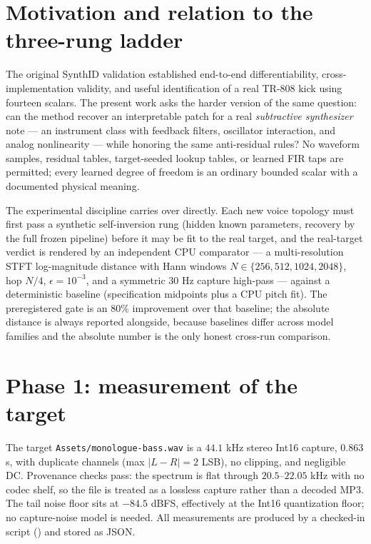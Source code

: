 \documentclass[10pt]{article}
\newcommand{\code}[1]{\texttt{#1}}
\begin{document}
\section{Motivation and relation to the three-rung ladder}

The original SynthID validation established end-to-end differentiability, cross-implementation validity, and useful identification of a real TR-808 kick using fourteen scalars. The present work asks the harder version of the same question: can the method recover an interpretable patch for a real \emph{subtractive synthesizer} note --- an instrument class with feedback filters, oscillator interaction, and analog nonlinearity --- while honoring the same anti-residual rules? No waveform samples, residual tables, target-seeded lookup tables, or learned FIR taps are permitted; every learned degree of freedom is an ordinary bounded scalar with a documented physical meaning.

The experimental discipline carries over directly. Each new voice topology must first pass a synthetic self-inversion rung (hidden known parameters, recovery by the full frozen pipeline) before it may be fit to the real target, and the real-target verdict is rendered by an independent CPU comparator --- a multi-resolution STFT log-magnitude distance with Hann windows $N\in\{256,512,1024,2048\}$, hop $N/4$, $\epsilon=10^{-3}$, and a symmetric $30$ Hz capture high-pass --- against a deterministic baseline (specification midpoints plus a CPU pitch fit). The preregistered gate is an $80\%$ improvement over that baseline; the absolute distance is always reported alongside, because baselines differ across model families and the absolute number is the only honest cross-run comparison.

\section{Phase 1: measurement of the target}

The target \code{Assets/monologue-bass.wav} is a $44.1$ kHz stereo Int16 capture, $0.863$ s, with duplicate channels (max $|L-R| = 2$ LSB), no clipping, and negligible DC. Provenance checks pass: the spectrum is flat through $20.5$--$22.05$ kHz with no codec shelf, so the file is treated as a lossless capture rather than a decoded MP3. The tail noise floor sits at $-84.5$ dBFS, effectively at the Int16 quantization floor; no capture-noise model is needed. All measurements are produced by a checked-in script () and stored as JSON.
\end{document}
